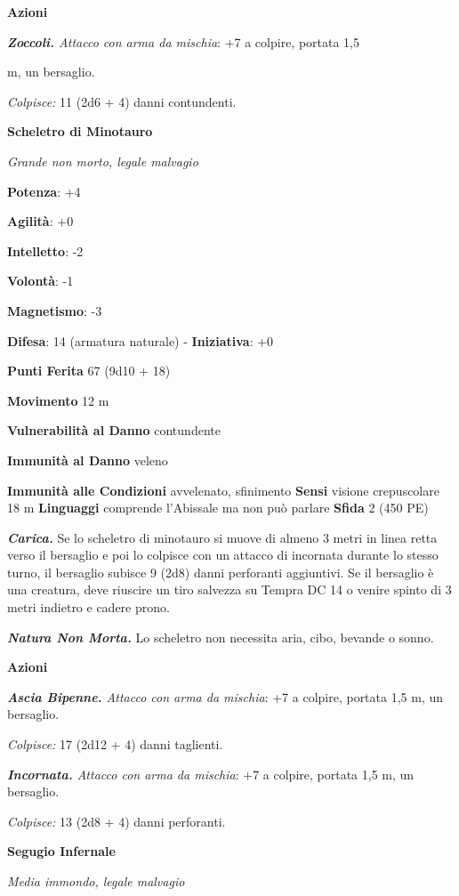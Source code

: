 \begin{multicols}{2}
\textbf{Azioni}


\emph{\textbf{Zoccoli.} Attacco con arma da mischia}: +7 a colpire,
portata 1,5

m, un bersaglio.

\emph{Colpisce:} 11 (2d6 + 4) danni contundenti.


\textbf{Scheletro di Minotauro}

\emph{Grande non morto, legale malvagio}

\textbf{Potenza}: +4

\textbf{Agilità}: +0

\textbf{Intelletto}: -2

\textbf{Volontà}: -1

\textbf{Magnetismo}: -3

\textbf{Difesa}: 14 (armatura naturale) - \textbf{Iniziativa}: +0

\textbf{Punti Ferita} 67 (9d10 + 18)

\textbf{Movimento} 12 m

\textbf{Vulnerabilità al Danno} contundente

\textbf{Immunità al Danno} veleno

\textbf{Immunità alle Condizioni} avvelenato, sfinimento \textbf{Sensi}
visione crepuscolare 18 m \textbf{Linguaggi} comprende
l'Abissale ma non può parlare \textbf{Sfida} 2 (450 PE)

\emph{\textbf{Carica.}} Se lo scheletro di minotauro si muove di almeno
3 metri in linea retta verso il bersaglio e poi lo colpisce con un
attacco di incornata durante lo stesso turno, il bersaglio subisce 9
(2d8) danni perforanti aggiuntivi. Se il bersaglio è una creatura, deve
riuscire un tiro salvezza su Tempra DC 14 o venire spinto di 3 metri
indietro e cadere prono.

\emph{\textbf{Natura Non Morta.}} Lo scheletro non necessita aria, cibo,
bevande o sonno.

\textbf{Azioni}

\emph{\textbf{Ascia Bipenne.} Attacco con arma da mischia}: +7 a
colpire, portata 1,5 m, un bersaglio.

\emph{Colpisce:} 17 (2d12 + 4) danni taglienti.

\emph{\textbf{Incornata.} Attacco con arma da mischia}: +7 a colpire,
portata 1,5 m, un bersaglio.

\emph{Colpisce:} 13 (2d8 + 4) danni perforanti.

\textbf{Segugio Infernale}

\emph{Media immondo, legale malvagio}


\end{multicols}
